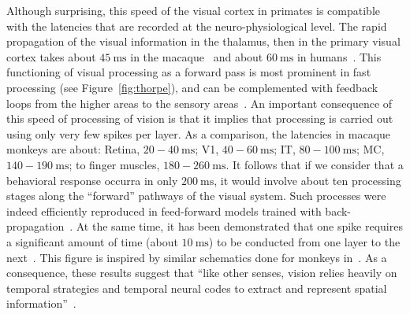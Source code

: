 \documentclass[brainsci, %
               review,submit,pdftex,moreauthors
               ]{Definitions/mdpi}
\newcommand{\ms}{\si{\milli\second}}%
\begin{document}
Although surprising, this speed of the visual cortex in primates is compatible with the latencies that are recorded at the neuro-physiological level. The rapid propagation of the visual information in the thalamus, then in the primary visual cortex takes about $45~\ms$ in the macaque~\citep{schmolesky_signal_1998} and about $60~\ms$ in humans~\citep{vanni_coinciding_2001}. This functioning of visual processing as a forward pass is most prominent in fast processing (see Figure~\ref{fig:thorpe}), and can be complemented with feedback loops from the higher areas to the sensory areas~\citep{lamme_distinct_2000}. An important consequence of this speed of processing of vision is that it implies that processing is carried out using only very few spikes per layer. As a comparison, the latencies in macaque monkeys are about: Retina, $20-40~\ms$; V1, $40-60~\ms$; IT, $80-100~\ms$; MC, $140-190~\ms$; to finger muscles, $180-260~\ms$. It follows that if we consider that a behavioral response occurra in only $200~\ms$, it would involve about ten processing stages along the ``forward'' pathways of the visual system. Such processes were indeed efficiently reproduced in feed-forward models trained with back-propagation~\citep{serre_feedforward_2007,jeremie_ultrafast_2022}. At the same time, it has been demonstrated that one spike requires a significant amount of time (about $10~\ms$) to be conducted from one layer to the next~\citep{nowak_timing_1997,thorpe_seeking_2001}.  This figure is inspired by similar schematics done for monkeys in~\citep{thorpe_seeking_2001}. As a consequence, these results suggest that ``like other senses, vision relies heavily on temporal strategies and temporal neural codes to extract and represent spatial information''~\citep{rucci_temporal_2018}.
\end{document}
